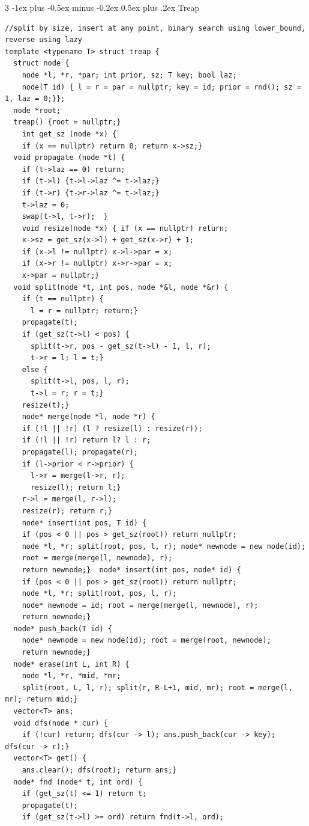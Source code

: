\documentclass[8pt,a4paper,onesided]{article}
\makeatletter
\renewcommand{\subsection}{\@startsection{subsection}{2}{0mm}
    {-1ex plus -0.5ex minus -0.2ex} %
    {0.5ex plus .2ex}                %
    {\normalfont\large\bfseries}}    %
\makeatother
\begin{document}
\begin{multicols}{3}
\subsection{Treap}
\begin{verbatim}
//split by size, insert at any point, binary search using lower_bound, reverse using lazy
template <typename T> struct treap {
  struct node {
    node *l, *r, *par; int prior, sz; T key; bool laz;
    node(T id) { l = r = par = nullptr; key = id; prior = rnd(); sz = 1, laz = 0;}};
  node *root;
  treap() {root = nullptr;}
    int get_sz (node *x) {
    if (x == nullptr) return 0; return x->sz;}
  void propagate (node *t) {
    if (t->laz == 0) return;
    if (t->l) {t->l->laz ^= t->laz;}
    if (t->r) {t->r->laz ^= t->laz;}
    t->laz = 0;
    swap(t->l, t->r);  }
    void resize(node *x) { if (x == nullptr) return;
    x->sz = get_sz(x->l) + get_sz(x->r) + 1;
    if (x->l != nullptr) x->l->par = x;
    if (x->r != nullptr) x->r->par = x;
    x->par = nullptr;}
  void split(node *t, int pos, node *&l, node *&r) {
    if (t == nullptr) {
      l = r = nullptr; return;}
    propagate(t);
    if (get_sz(t->l) < pos) {
      split(t->r, pos - get_sz(t->l) - 1, l, r);
      t->r = l; l = t;}
    else {
      split(t->l, pos, l, r);
      t->l = r; r = t;}
    resize(t);}
    node* merge(node *l, node *r) {
    if (!l || !r) (l ? resize(l) : resize(r));
    if (!l || !r) return l? l : r;
    propagate(l); propagate(r);
    if (l->prior < r->prior) {
      l->r = merge(l->r, r);
      resize(l); return l;}
    r->l = merge(l, r->l);
    resize(r); return r;}
    node* insert(int pos, T id) {
    if (pos < 0 || pos > get_sz(root)) return nullptr;
    node *l, *r; split(root, pos, l, r); node* newnode = new node(id);
    root = merge(merge(l, newnode), r);
    return newnode;}  node* insert(int pos, node* id) {
    if (pos < 0 || pos > get_sz(root)) return nullptr;
    node *l, *r; split(root, pos, l, r);
    node* newnode = id; root = merge(merge(l, newnode), r);
    return newnode;}
  node* push_back(T id) {
    node* newnode = new node(id); root = merge(root, newnode);
    return newnode;}
  node* erase(int L, int R) {
    node *l, *r, *mid, *mr;
    split(root, L, l, r); split(r, R-L+1, mid, mr); root = merge(l, mr); return mid;} 
  vector<T> ans;
  void dfs(node * cur) {
    if (!cur) return; dfs(cur -> l); ans.push_back(cur -> key); dfs(cur -> r);}
  vector<T> get() {
    ans.clear(); dfs(root); return ans;}
  node* fnd (node* t, int ord) {
    if (get_sz(t) <= 1) return t;
    propagate(t);
    if (get_sz(t->l) >= ord) return fnd(t->l, ord);

\end{verbatim}
\end{multicols}
\end{document}

